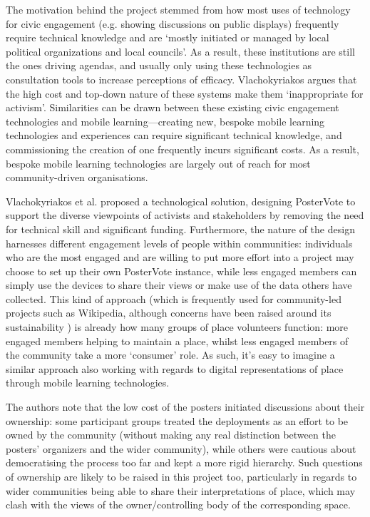 The motivation behind the project stemmed from how most uses of technology for civic engagement (e.g. showing discussions on public displays) frequently require technical knowledge and are `mostly initiated or managed by local political organizations and local councils'. As a result, these institutions are still the ones driving agendas, and usually only using these technologies as consultation tools to increase perceptions of efficacy. Vlachokyriakos argues that the high cost and top-down nature of these systems make them `inappropriate for activism'. Similarities can be drawn between these existing civic engagement technologies and mobile learning---creating new, bespoke mobile learning technologies and experiences can require significant technical knowledge, and commissioning the creation of one frequently incurs significant costs. As a result, bespoke mobile learning technologies are largely out of reach for most community-driven organisations.

Vlachokyriakos et al. proposed a technological solution, designing PosterVote to support the diverse viewpoints of activists and stakeholders by removing the need for technical skill and significant funding. Furthermore, the nature of the design harnesses different engagement levels of people within communities: individuals who are the most engaged and are willing to put more effort into a project may choose to set up their own PosterVote instance, while less engaged members can simply use the devices to share their views or make use of the data others have collected. This kind of approach (which is frequently used for community-led projects such as Wikipedia, although concerns have been raised around its sustainability \citep{Simonite2013}) is already how many groups of place volunteers function: more engaged members helping to maintain a place, whilst less engaged members of the community take a more `consumer' role. As such, it's easy to imagine a similar approach also working with regards to digital representations of place through mobile learning technologies.

The authors note that the low cost of the posters initiated discussions about their ownership: some participant groups treated the deployments as an effort to be owned by the community (without making any real distinction between the posters' organizers and the wider community), while others were cautious about democratising the process too far and kept a more rigid hierarchy. Such questions of ownership are likely to be raised in this project too, particularly in regards to wider communities being able to share their interpretations of place, which may clash with the views of the owner/controlling body of the corresponding space.

